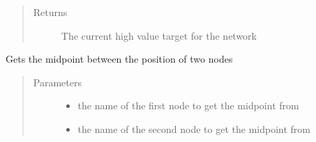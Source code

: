 \documentclass[letterpaper,10pt,english]{sphinxmanual}
\begin{document}
\begin{fulllineitems}

\begin{fulllineitems}
\label{\detokenize{source/yawning_titan.envs.generic.core:yawning_titan.envs.generic.core.network_interface.NetworkInterface.get_high_value_node}}\begin{quote}\begin{description}
\item[{Returns}] \leavevmode
\sphinxAtStartPar
The current high value target for the network

\end{description}\end{quote}

\end{fulllineitems}


\begin{fulllineitems}
\label{\detokenize{source/yawning_titan.envs.generic.core:yawning_titan.envs.generic.core.network_interface.NetworkInterface.get_midpoint}}
\sphinxAtStartPar
Gets the midpoint between the position of two nodes
\begin{quote}\begin{description}
\item[{Parameters}] \leavevmode\begin{itemize}
\item {}
\sphinxAtStartPar
{} \textendash{} the name of the first node to get the midpoint from

\item {}
\sphinxAtStartPar
{} \textendash{} the name of the second node to get the midpoint from


\end{itemize}
\end{description}
\end{quote}
\end{fulllineitems}
\end{fulllineitems}
\end{document}
